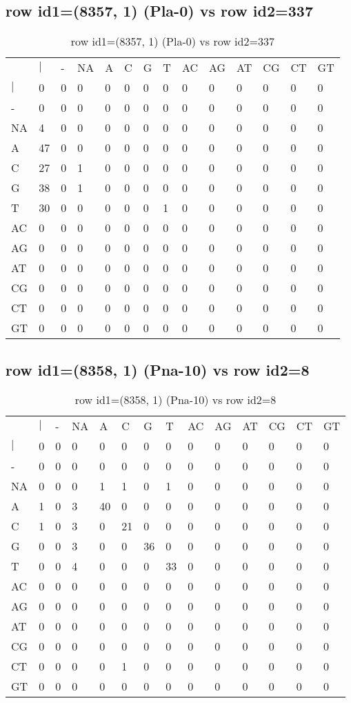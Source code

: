 \subsection{row id1=(8357, 1) (Pla-0) vs row id2=337}
\begin{center}
\begin{longtable}{|l|l|l|l|l|l|l|l|l|l|l|l|l|l|}
\caption{row id1=(8357, 1) (Pla-0) vs row id2=337} \label{table_dm378}\\
\hline
\\
\hline
&$|$&-&NA&A&C&G&T&AC&AG&AT&CG&CT&GT\\
$|$&0&0&0&0&0&0&0&0&0&0&0&0&0\\
-&0&0&0&0&0&0&0&0&0&0&0&0&0\\
NA&4&0&0&0&0&0&0&0&0&0&0&0&0\\
A&47&0&0&0&0&0&0&0&0&0&0&0&0\\
C&27&0&1&0&0&0&0&0&0&0&0&0&0\\
G&38&0&1&0&0&0&0&0&0&0&0&0&0\\
T&30&0&0&0&0&0&1&0&0&0&0&0&0\\
AC&0&0&0&0&0&0&0&0&0&0&0&0&0\\
AG&0&0&0&0&0&0&0&0&0&0&0&0&0\\
AT&0&0&0&0&0&0&0&0&0&0&0&0&0\\
CG&0&0&0&0&0&0&0&0&0&0&0&0&0\\
CT&0&0&0&0&0&0&0&0&0&0&0&0&0\\
GT&0&0&0&0&0&0&0&0&0&0&0&0&0\\
\hline
\end{longtable}
\end{center}

\subsection{row id1=(8358, 1) (Pna-10) vs row id2=8}
\begin{center}
\begin{longtable}{|l|l|l|l|l|l|l|l|l|l|l|l|l|l|}
\caption{row id1=(8358, 1) (Pna-10) vs row id2=8} \label{table_dm380}\\
\hline
\\
\hline
&$|$&-&NA&A&C&G&T&AC&AG&AT&CG&CT&GT\\
$|$&0&0&0&0&0&0&0&0&0&0&0&0&0\\
-&0&0&0&0&0&0&0&0&0&0&0&0&0\\
NA&0&0&0&1&1&0&1&0&0&0&0&0&0\\
A&1&0&3&40&0&0&0&0&0&0&0&0&0\\
C&1&0&3&0&21&0&0&0&0&0&0&0&0\\
G&0&0&3&0&0&36&0&0&0&0&0&0&0\\
T&0&0&4&0&0&0&33&0&0&0&0&0&0\\
AC&0&0&0&0&0&0&0&0&0&0&0&0&0\\
AG&0&0&0&0&0&0&0&0&0&0&0&0&0\\
AT&0&0&0&0&0&0&0&0&0&0&0&0&0\\
CG&0&0&0&0&0&0&0&0&0&0&0&0&0\\
CT&0&0&0&0&1&0&0&0&0&0&0&0&0\\
GT&0&0&0&0&0&0&0&0&0&0&0&0&0\\
\hline
\end{longtable}
\end{center}

